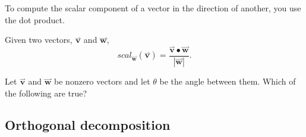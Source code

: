 \documentclass{ximera}
\begin{document}
To compute the scalar component of a vector in the direction of
another, you use the dot product.

\begin{theorem}
  Given two vectors, $\overset{\boldsymbol{\rightharpoonup}}{\mathbf{v}}$ and $\overset{\boldsymbol{\rightharpoonup}}{\mathbf{w}}$,
  \[
  scal_{\overset{\boldsymbol{\rightharpoonup}}{\mathbf{w}}}(\overset{\boldsymbol{\rightharpoonup}}{\mathbf{v}}) =\frac{\overset{\boldsymbol{\rightharpoonup}}{\mathbf{v}} \bullet \overset{\boldsymbol{\rightharpoonup}}{\mathbf{w}}}{|\overset{\boldsymbol{\rightharpoonup}}{\mathbf{w}}|}.
  \]
\end{theorem}

\begin{question}
  Let $\overset{\boldsymbol{\rightharpoonup}}{\mathbf{v}}$ and $\overset{\boldsymbol{\rightharpoonup}}{\mathbf{w}}$ be nonzero vectors and let $\theta$ be
  the angle between them. Which of the following are true?
  \begin{selectAll}
  \end{selectAll}
\end{question}



\subsection{Orthogonal decomposition}
\end{document}
